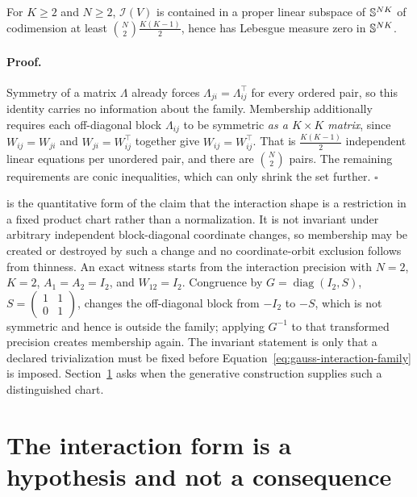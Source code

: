 For $K\geq2$ and $N\geq2$, $\mathcal I(V)$ is contained in a proper linear subspace of $\mathbb S^{NK}$ of codimension at least $\binom N2\tfrac{K(K-1)}{2}$, hence has Lebesgue measure zero in $\mathbb S^{NK}$. 

\paragraph{Proof.}
Symmetry of a matrix $\Lambda$ already forces $\Lambda_{ji}=\Lambda_{ij}^\top$ for every ordered pair, so this identity carries no information about the family. Membership additionally requires each off-diagonal block $\Lambda_{ij}$ to be symmetric \emph{as a $K\times K$ matrix}, since $W_{ij}=W_{ji}$ and $W_{ji}=W_{ij}^\top$ together give $W_{ij}=W_{ij}^\top$. That is $\tfrac{K(K-1)}{2}$ independent linear equations per unordered pair, and there are $\binom N2$ pairs. The remaining requirements are conic inequalities, which can only shrink the set further. $\square$

 is the quantitative form of the claim that the interaction shape is a restriction in a fixed product chart rather than a normalization. It is not invariant under arbitrary independent block-diagonal coordinate changes, so membership may be created or destroyed by such a change and no coordinate-orbit exclusion follows from thinness. An exact witness starts from the interaction precision with \(N=2\), \(K=2\), \(A_1=A_2=I_2\), and \(W_{12}=I_2\). Congruence by \(G=\operatorname{diag}(I_2,S)\), \(S=\left(\begin{smallmatrix}1&1\\0&1\end{smallmatrix}\right)\), changes the off-diagonal block from \(-I_2\) to \(-S\), which is not symmetric and hence is outside the family; applying \(G^{-1}\) to that transformed precision creates membership again. The invariant statement is only that a declared trivialization must be fixed before Equation~\eqref{eq:gauss-interaction-family} is imposed. Section~\ref{sec:gauss-hypothesis} asks when the generative construction supplies such a distinguished chart.

\section{The interaction form is a hypothesis and not a consequence}
\label{sec:gauss-hypothesis}

